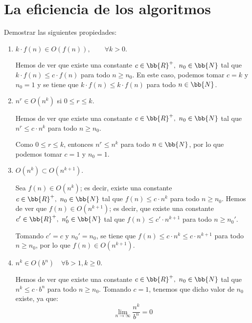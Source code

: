 \section{La eficiencia de los algoritmos}

\begin{ejercicio}
    Demostrar las siguientes propiedades:
    \begin{enumerate}[label=\alph*)]
        \item $k\cdot f(n) \in O(f(n)), \qquad \forall k > 0$.
        
        Hemos de ver que existe una constante $c\in \bb{R}^+,~n_0\in \bb{N}$ tal que $k\cdot f(n) \leq c\cdot f(n)$ para todo $n\geq n_0$.
        En este caso, podemos tomar $c=k$ y $n_0=1$ y se tiene que $k\cdot f(n) \leq k\cdot f(n)$ para todo $n\in \bb{N}$.
        
        \item $n^r\in O(n^k)$ si $0\leq r \leq k$.
        
        Hemos de ver que existe una constante $c\in \bb{R}^+,~n_0\in \bb{N}$ tal que $n^r \leq c\cdot n^k$ para todo $n\geq n_0$.

        Como $0\leq r \leq k$, entonces $n^r \leq n^k$ para todo $n\in \bb{N}$, por lo que podemos tomar $c=1$ y $n_0=1$.

        \item $O(n^k) \subset O(n^{k+1})$.
        
        Sea $f(n)\in O(n^k)$; es decir, existe una constante $c\in \bb{R}^+,~n_0\in \bb{N}$ tal que $f(n)\leq c\cdot n^k$ para todo $n\geq n_0$.
        Hemos de ver que $f(n)\in O(n^{k+1})$; es decir, que existe una constante $c'\in \bb{R}^+,~n_0'\in \bb{N}$ tal que $f(n)\leq c'\cdot n^{k+1}$ para todo $n\geq n_0'$.

        Tomando $c'=c$ y $n_0'=n_0$, se tiene que $f(n)\leq c\cdot n^k\leq c\cdot n^{k+1}$ para todo $n\geq n_0$, por lo que $f(n)\in O(n^{k+1})$.

        \item $n^k\in O(b^n) \quad \forall b>1,k\geq 0$.
        
        Hemos de ver que existe una constante $c\in \bb{R}^+,~n_0\in \bb{N}$ tal que $n^k \leq c\cdot b^n$ para todo $n\geq n_0$.
        Tomando $c=1$, tenemos que dicho valor de $n_0$ existe, ya que:
        \begin{equation*}
            \lim_{n\to\infty} \frac{n^k}{b^n} = 0
        \end{equation*}



\end{enumerate}
\end{ejercicio}
